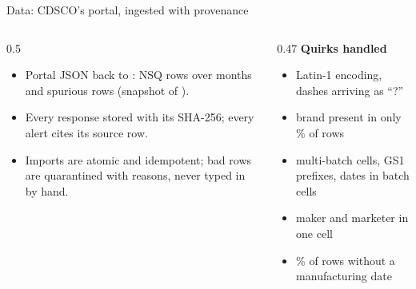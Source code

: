 \documentclass[aspectratio=169,11pt]{beamer}
\begin{document}
\begin{frame}{Data: CDSCO's portal, ingested with provenance}
\small
\begin{columns}[T]
\begin{column}{0.5\textwidth}
\begin{itemize}
\item Portal JSON back to \FirstMonth: \NumNsqRows{} NSQ rows over \NumMonths{} months and \NumSpuriousTabRows{} spurious rows (snapshot of \SnapshotDate).
\item Every response stored with its SHA-256; every alert cites its source row.
\item Imports are atomic and idempotent; bad rows are quarantined with reasons, never typed in by hand.
\end{itemize}
\end{column}
\begin{column}{0.47\textwidth}
\small
\textbf{Quirks handled}
\begin{itemize}
\item Latin-1 encoding, dashes arriving as ``?''
\item brand present in only \BrandPresentPct\% of rows
\item multi-batch cells, GS1 prefixes, dates in batch cells
\item maker and marketer in one cell
\item \MissingDatePct\% of rows without a manufacturing date
\end{itemize}
\end{column}
\end{columns}
\end{frame}
\end{document}
